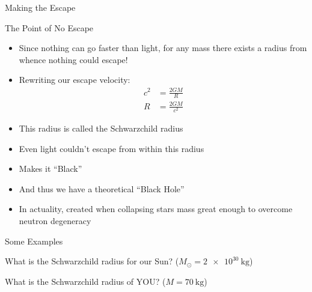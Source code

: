 \documentclass[pdf, aspectratio=169]{beamer}
\begin{document}
\begin{frame}{Making the Escape}
  \begin{center}
  \end{center}
\end{frame}

\begin{frame}{The Point of No Escape}
  \begin{itemize}
	\item Since nothing can go faster than light, for any mass there exists a radius from whence nothing could escape!
	\item Rewriting our escape velocity:
	  \begin{align*}
		c^2 &= \frac{2GM}{R} \\
		R &= \frac{2GM}{c^2}
	  \end{align*}
	\item This radius is called the Schwarzchild radius
	\item Even light couldn't escape from within this radius
	\item Makes it ``Black''
	\item And thus we have a theoretical ``Black Hole''
	\item In actuality, created when collapsing stars mass great enough to overcome neutron degeneracy
  \end{itemize}
\end{frame}

\begin{frame}{Some Examples}
  \begin{example}
	What is the Schwarzchild radius for our Sun? ($M_\odot = \SI{2e30}{\kilo\gram}$)
  \end{example}
  \begin{example}
	What is the Schwarzchild radius of YOU? ($M = \SI{70}{\kilo\gram}$)
  \end{example}
\end{frame}
\end{document}

